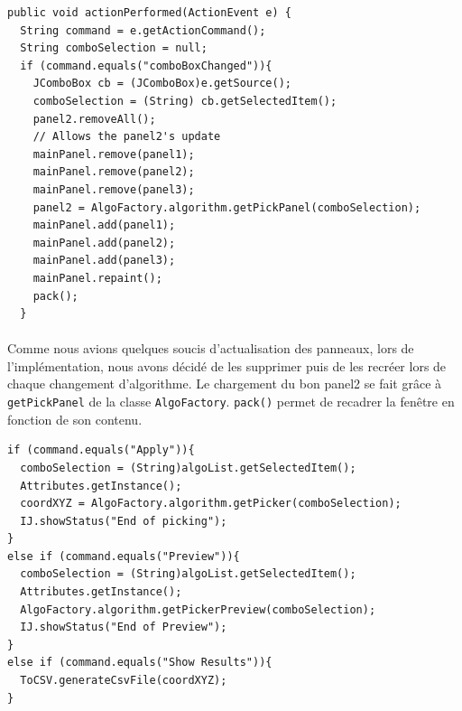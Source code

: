 \begin{center}
\begin{fmpage}{15cm}
\begin{small}
\begin{lstlisting}[breaklines=true, breakatwhitespace=true]
public void actionPerformed(ActionEvent e) {
  String command = e.getActionCommand();
  String comboSelection = null;
  if (command.equals("comboBoxChanged")){
    JComboBox cb = (JComboBox)e.getSource();
    comboSelection = (String) cb.getSelectedItem();
    panel2.removeAll();
    // Allows the panel2's update
    mainPanel.remove(panel1);
    mainPanel.remove(panel2);
    mainPanel.remove(panel3);
    panel2 = AlgoFactory.algorithm.getPickPanel(comboSelection);
    mainPanel.add(panel1);
    mainPanel.add(panel2);
    mainPanel.add(panel3);
    mainPanel.repaint();
    pack();
  }
\end{lstlisting}
\end{small}
\end{fmpage}
\end{center}

\paragraph*{}
Comme nous avions quelques soucis d'actualisation des panneaux, lors de l'implémentation, nous avons décidé de les supprimer puis de les recréer lors de chaque changement d'algorithme. Le chargement du bon panel2 se fait gr\^ace à \texttt{getPickPanel} de la classe \texttt{AlgoFactory}. \texttt{pack()} permet de recadrer la fenêtre en fonction de son contenu. 

\begin{center}
\begin{fmpage}{15cm}
\begin{small}
\begin{lstlisting}
if (command.equals("Apply")){
  comboSelection = (String)algoList.getSelectedItem();
  Attributes.getInstance();
  coordXYZ = AlgoFactory.algorithm.getPicker(comboSelection);
  IJ.showStatus("End of picking");
}
else if (command.equals("Preview")){
  comboSelection = (String)algoList.getSelectedItem();
  Attributes.getInstance();
  AlgoFactory.algorithm.getPickerPreview(comboSelection);
  IJ.showStatus("End of Preview");
}
else if (command.equals("Show Results")){
  ToCSV.generateCsvFile(coordXYZ);
}
\end{lstlisting}
\end{small}	
\end{fmpage}
\end{center}

